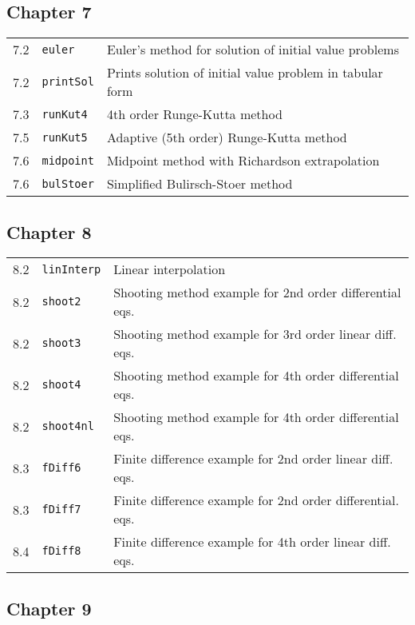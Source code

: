 \subsection{Chapter 7}

\begin{tabular}{lll}
7.2 & \texttt{euler} & Euler's method for solution of initial value problems
\\ 
7.2 & \texttt{printSol} & Prints solution of initial value problem in
tabular form \\ 
7.3 & \texttt{runKut4} & 4th order Runge-Kutta method \\ 
7.5 & \texttt{runKut5} & Adaptive (5th order) Runge-Kutta method \\ 
7.6 & \texttt{midpoint} & Midpoint method with Richardson extrapolation \\ 
7.6 & \texttt{bulStoer} & Simplified Bulirsch-Stoer method%
\end{tabular}

\subsection{Chapter 8}

\begin{tabular}{lll}
8.2 & \texttt{linInterp} & Linear interpolation \\ 
8.2 & \texttt{shoot2} & Shooting method example for 2nd order differential
eqs. \\ 
8.2 & \texttt{shoot3} & Shooting method example for 3rd order linear diff.
eqs. \\ 
8.2 & \texttt{shoot4} & Shooting method example for 4th order differential
eqs. \\ 
8.2 & \texttt{shoot4nl} & Shooting method example for 4th order differential
eqs. \\ 
8.3 & \texttt{fDiff6} & Finite difference example for 2nd order linear diff.
eqs. \\ 
8.3 & \texttt{fDiff7} & Finite difference example for 2nd order
differential. eqs. \\ 
8.4 & \texttt{fDiff8} & Finite difference example for 4th order linear diff.
eqs.%
\end{tabular}

\subsection{Chapter 9}

